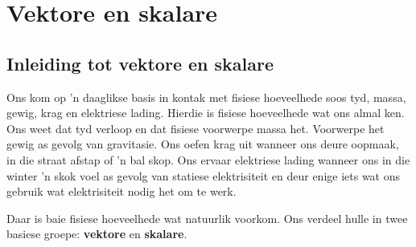          \chapter{Vektore en skalare}\label{chap:vectors}
    \setcounter{figure}{1}
    \setcounter{subfigure}{1}
    \label{59e414b70efc194a27a122db47d06ce6}
         \section{Inleiding tot vektore en skalare}
    \nopagebreak
Ons kom op  'n daaglikse basis in kontak met fisiese hoeveelhede soos tyd, massa, gewig, krag en elektriese lading. Hierdie is fisiese hoeveelhede wat ons almal ken. Ons weet dat tyd verloop en dat fisiese voorwerpe massa het. Voorwerpe het gewig as gevolg van gravitasie. Ons oefen krag uit wanneer ons deure oopmaak, in die straat afstap of  'n bal skop. Ons ervaar elektriese lading wanneer ons in die winter  'n skok voel as gevolg van statiese elektrisiteit en deur enige iets wat ons gebruik wat elektrisiteit nodig het om te werk.

Daar is baie fisiese hoeveelhede wat natuurlik voorkom. Ons verdeel hulle in twee basiese groepe: \textbf{vektore} en \textbf{skalare}.\\

